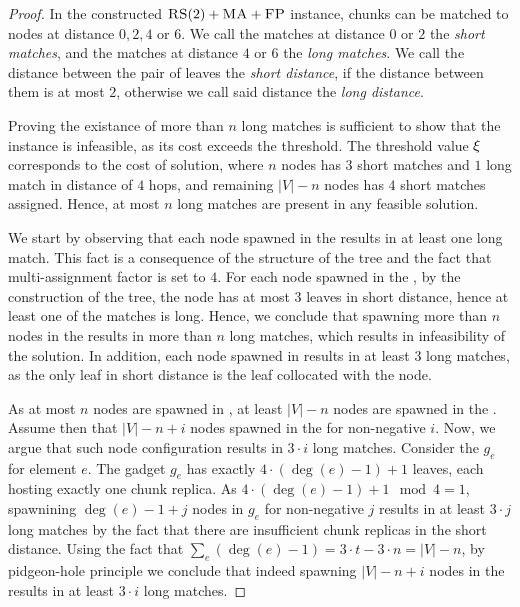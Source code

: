 \begin{proof}
  In the constructed $\textsc{RS}(2)+\textsc{MA}+\textsc{FP}$ instance, chunks can be matched to nodes at distance $0, 2, 4$ or $6$.
  We call the matches at distance $0$ or $2$ the \emph{short matches}, and the matches at distance $4$ or $6$ the \emph{long matches}.
  We call the distance between the pair of leaves the \emph{short distance}, if the distance between them is at most $2$, otherwise we call said distance the \emph{long distance}.

Proving the existance of more than $n$ long matches is sufficient to show that the instance is infeasible, as its cost exceeds the threshold.
The threshold value $\xi$ corresponds to the cost of solution, where $n$ nodes has $3$ short matches and $1$ long match in distance of $4$ hops, and remaining $|V|-n$ nodes has $4$ short matches assigned.
Hence, at most $n$ long matches are present in any feasible solution.

We start by observing that each node spawned in the \MatchSubtree{} results in at least one long match.
This fact is a consequence of the structure of the tree and the fact that multi-assignment factor is set to $4$.
For each node spawned in the \MatchSubtree{}, by the construction of the tree, the node has at most $3$ leaves in short distance, hence at least one of the matches is long.
Hence, we conclude that spawning more than $n$ nodes in the \MatchSubtree{} results in more than $n$ long matches, which results in infeasibility of the solution.
In addition, each node spawned in \UnqGadget{} results in at least $3$ long matches, as the only leaf in short distance is the leaf collocated with the node.

As at most $n$ nodes are spawned in \MatchSubtree{}, at least $|V|-n$ nodes are spawned in the \CoverSubtree.
Assume then that $|V|-n+i$ nodes spawned in the \CoverSubtree{} for non-negative $i$.
Now, we argue that such node configuration results in $3\cdot i$ long matches.
Consider the \ElGadget{} $g_e$ for element $e$.
The gadget $g_e$ has exactly $4\cdot(\deg(e)-1)+1$ leaves, each hosting exactly one chunk replica.
As $4\cdot(\deg(e)-1)+1 \mod 4 = 1$, spawnining $\deg(e)-1+j$ nodes in $g_e$ for non-negative $j$ results in at least $3\cdot j$ long matches by the fact that there are insufficient chunk replicas in the short distance.
Using the fact that $\sum_e(\deg(e)-1) = 3\cdot t - 3\cdot n = |V| - n$, by pidgeon-hole principle we conclude that indeed spawning $|V|-n+i$ nodes in the \CoverSubtree{} results in at least $3\cdot i$ long matches.


\end{proof}
